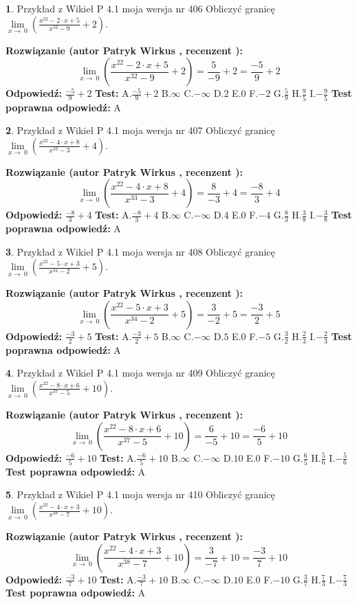 \documentclass[12pt, a4paper]{article}
\theoremstyle{definition} %
\newtheorem{zad}{}
\newcommand{\zadStart}[1]{\begin{zad}#1\newline}
\newcommand{\zadStop}{\end{zad}}
\newcommand{\rozwStart}[2]{\noindent \textbf{Rozwiązanie (autor #1 , recenzent #2): }\newline}
\newcommand{\rozwStop}{\newline}
\newcommand{\odpStart}{\noindent \textbf{Odpowiedź:}\newline}
\newcommand{\odpStop}{\newline}
\newcommand{\testStart}{\noindent \textbf{Test:}\newline}
\newcommand{\testStop}{\newline}
\newcommand{\kluczStart}{\noindent \textbf{Test poprawna odpowiedź:}\newline}
\newcommand{\kluczStop}{\newline}
\begin{document}
\zadStart{Przykład z Wikieł P 4.1 moja wersja nr 406}
Obliczyć granicę $\lim\limits_{x\to\ 0}(\frac{x^{22}-2 \cdot x +5}{x^{32}-9}+2)$.
\zadStop
\rozwStart{Patryk Wirkus}{}
$$\lim\limits_{x\to\ 0}(\frac{x^{22}-2 \cdot x +5}{x^{32}-9}+2)=\frac{5}{-9}+2=\frac{-5}{9}+2$$
\rozwStop
\odpStart
$\frac{-5}{9}+2$
\odpStop
\testStart
A.$\frac{-5}{9}+2$
B.$\infty$
C.$-\infty$
D.$2$
E.$0$
F.$-2$
G.$\frac{5}{9}$
H.$\frac{9}{5}$
I.$-\frac{9}{5}$
\testStop
\kluczStart
A
\kluczStop



\zadStart{Przykład z Wikieł P 4.1 moja wersja nr 407}
Obliczyć granicę $\lim\limits_{x\to\ 0}(\frac{x^{22}-4 \cdot x +8}{x^{33}-3}+4)$.
\zadStop
\rozwStart{Patryk Wirkus}{}
$$\lim\limits_{x\to\ 0}(\frac{x^{22}-4 \cdot x +8}{x^{33}-3}+4)=\frac{8}{-3}+4=\frac{-8}{3}+4$$
\rozwStop
\odpStart
$\frac{-8}{3}+4$
\odpStop
\testStart
A.$\frac{-8}{3}+4$
B.$\infty$
C.$-\infty$
D.$4$
E.$0$
F.$-4$
G.$\frac{8}{3}$
H.$\frac{3}{8}$
I.$-\frac{3}{8}$
\testStop
\kluczStart
A
\kluczStop



\zadStart{Przykład z Wikieł P 4.1 moja wersja nr 408}
Obliczyć granicę $\lim\limits_{x\to\ 0}(\frac{x^{22}-5 \cdot x +3}{x^{34}-2}+5)$.
\zadStop
\rozwStart{Patryk Wirkus}{}
$$\lim\limits_{x\to\ 0}(\frac{x^{22}-5 \cdot x +3}{x^{34}-2}+5)=\frac{3}{-2}+5=\frac{-3}{2}+5$$
\rozwStop
\odpStart
$\frac{-3}{2}+5$
\odpStop
\testStart
A.$\frac{-3}{2}+5$
B.$\infty$
C.$-\infty$
D.$5$
E.$0$
F.$-5$
G.$\frac{3}{2}$
H.$\frac{2}{3}$
I.$-\frac{2}{3}$
\testStop
\kluczStart
A
\kluczStop



\zadStart{Przykład z Wikieł P 4.1 moja wersja nr 409}
Obliczyć granicę $\lim\limits_{x\to\ 0}(\frac{x^{22}-8 \cdot x +6}{x^{37}-5}+10)$.
\zadStop
\rozwStart{Patryk Wirkus}{}
$$\lim\limits_{x\to\ 0}(\frac{x^{22}-8 \cdot x +6}{x^{37}-5}+10)=\frac{6}{-5}+10=\frac{-6}{5}+10$$
\rozwStop
\odpStart
$\frac{-6}{5}+10$
\odpStop
\testStart
A.$\frac{-6}{5}+10$
B.$\infty$
C.$-\infty$
D.$10$
E.$0$
F.$-10$
G.$\frac{6}{5}$
H.$\frac{5}{6}$
I.$-\frac{5}{6}$
\testStop
\kluczStart
A
\kluczStop



\zadStart{Przykład z Wikieł P 4.1 moja wersja nr 410}
Obliczyć granicę $\lim\limits_{x\to\ 0}(\frac{x^{22}-4 \cdot x +3}{x^{38}-7}+10)$.
\zadStop
\rozwStart{Patryk Wirkus}{}
$$\lim\limits_{x\to\ 0}(\frac{x^{22}-4 \cdot x +3}{x^{38}-7}+10)=\frac{3}{-7}+10=\frac{-3}{7}+10$$
\rozwStop
\odpStart
$\frac{-3}{7}+10$
\odpStop
\testStart
A.$\frac{-3}{7}+10$
B.$\infty$
C.$-\infty$
D.$10$
E.$0$
F.$-10$
G.$\frac{3}{7}$
H.$\frac{7}{3}$
I.$-\frac{7}{3}$
\testStop
\kluczStart
A
\kluczStop
\end{document}
